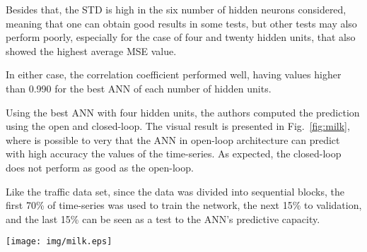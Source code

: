 Besides that, the STD is high in the six number of hidden neurons considered, meaning that one can obtain good results in some tests, but other tests may also perform poorly, especially for the case of four and twenty hidden units, that also showed the highest average MSE value. 

In either case, the correlation coefficient performed well, having values higher than 0.990 for the best ANN of each number of hidden units.

\begin{table}[htbp]
\caption{Summary of the tests performed with the LMA in the milk production test data set.}
\label{tab:lmamilk}
\end{table}

Using the best ANN with four hidden units, the authors computed the prediction using the open and closed-loop. The visual result is presented in Fig.~\ref{fig:milk}, where is possible to very that the ANN in open-loop architecture can predict with high accuracy the values of the time-series. As expected, the closed-loop does not perform as good as the open-loop.

Like the traffic data set, since the data was divided into sequential blocks, the first 70\% of time-series was used to train the network, the next 15\% to validation, and the last 15\% can be seen as a test to the ANN's predictive capacity.

\begin{figure*}[htbp]
  \centering
\texttt{[image: img/milk.eps]}
  \caption{The original, open-loop and closed-loop predictions of the milk production data set.}
  \label{fig:milk}
\end{figure*}

